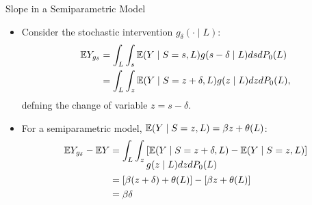 \documentclass{beamer}
\begin{document}

\begin{frame}[c]{Slope in a Semiparametric Model}

\begin{center}
\begin{itemize}
  \itemsep8pt
  \item Consider the stochastic intervention $g_{\delta}(\cdot \mid L)$:
    \begin{align*}
      \mathbb{E} Y_{g_{\delta}} &= \int_L \int_s \mathbb{E}(Y \mid S = s, L) g(s - \delta
            \mid L) ds dP_0(L) \\
        &= \int_L \int_z \mathbb{E}(Y \mid S = z + \delta, L) g(z \mid L) dz dP_0(L),
    \end{align*}
      defning the change of variable $z = s - \delta$.
  \item For a semiparametric model, $\mathbb{E} (Y \mid S = z, L) = \beta z +
    \theta(L)$:
    \begin{align*}
      \mathbb{E} Y_{g_{\delta}} - \mathbb{E} Y &= \int_L \int_z
      \begin{aligned}[t]
        & [\mathbb{E}(Y \mid S = z + \delta, L) - \mathbb{E}(Y \mid S = z, L)] \\
        & g(z \mid L) dz dP_0(L)
      \end{aligned} \\
      &= [\beta (z + \delta) + \theta(L)] - [\beta z + \theta(L)] \\
      &= \beta \delta
    \end{align*}
\end{itemize}
\end{center}

\note{
}

\end{frame}

\end{document}
